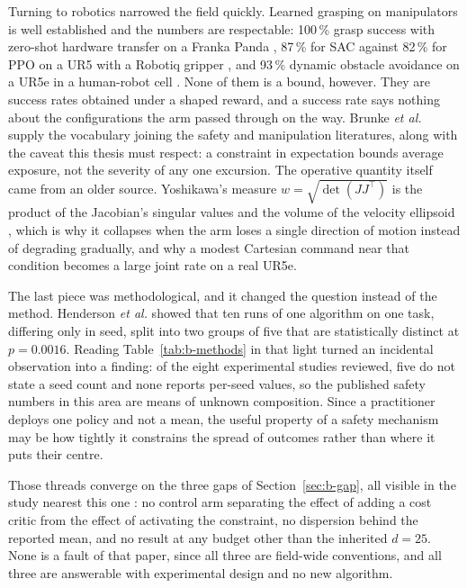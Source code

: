 Turning to robotics narrowed the field quickly. Learned grasping on manipulators is well
established and the numbers are respectable: 100\,\% grasp success with zero-shot hardware
transfer on a Franka Panda \cite{shahid2022continuous_grasping}, 87\,\% for SAC against 82\,\%
for PPO on a UR5 with a Robotiq gripper \cite{ferreira2025grasping}, and 93\,\% dynamic obstacle
avoidance on a UR5e in a human-robot cell \cite{xia2024proactive}. None of them is a bound,
however. They are success rates obtained under a shaped reward, and a success rate says nothing
about the configurations the arm passed through on the way. Brunke \emph{et al.}
\cite{brunke2022safe} supply the vocabulary joining the safety and manipulation literatures,
along with the caveat this thesis must respect: a constraint in expectation bounds average
exposure, not the severity of any one excursion. The operative quantity itself came from an older
source. Yoshikawa's measure \(w=\sqrt{\det(JJ^{\top})}\) is the product of the Jacobian's
singular values and the volume of the velocity ellipsoid
\cite{yoshikawa1985manipulability}, which is why it collapses when the arm loses a single
direction of motion instead of degrading gradually, and why a modest Cartesian command near that
condition becomes a large joint rate on a real UR5e.

The last piece was methodological, and it changed the question instead of the method. Henderson
\emph{et al.} \cite{henderson2018matters} showed that ten runs of one algorithm on one task,
differing only in seed, split into two groups of five that are statistically distinct at
\(p=0.0016\). Reading Table~\ref{tab:b-methods} in that light turned an incidental observation
into a finding: of the eight experimental studies reviewed, five do not state a seed count and
none reports per-seed values, so the published safety numbers in this area are means of unknown
composition. Since a practitioner deploys one policy and not a mean, the useful property of a
safety mechanism may be how tightly it constrains the spread of outcomes rather than where it
puts their centre.

Those threads converge on the three gaps of Section~\ref{sec:b-gap}, all visible in the study
nearest this one \cite{khan2026rl_precision_grasping}: no control arm separating the effect of
adding a cost critic from the effect of activating the constraint, no dispersion behind the
reported mean, and no result at any budget other than the inherited \(d=25\). None is a fault of
that paper, since all three are field-wide conventions, and all three are answerable with
experimental design and no new algorithm.

